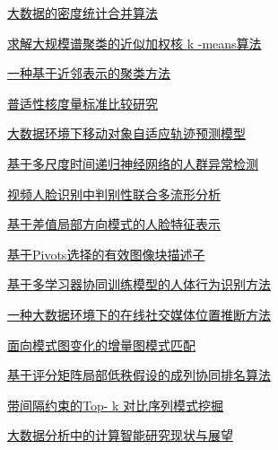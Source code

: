 \documentclass[a4paper]{article}
\begin{document}
\href{http://www.jos.org.cn/ch/reader/download_pdf.aspx?file_no=4902&year_id=2015&quarter_id=11&falg=1}{大数据的密度统计合并算法}

\href{http://www.jos.org.cn/ch/reader/download_pdf.aspx?file_no=4888&year_id=2015&quarter_id=11&falg=1}{求解大规模谱聚类的近似加权核 k -means算法}

\href{http://www.jos.org.cn/ch/reader/download_pdf.aspx?file_no=4895&year_id=2015&quarter_id=11&falg=1}{一种基于近邻表示的聚类方法}

\href{http://www.jos.org.cn/ch/reader/download_pdf.aspx?file_no=4905&year_id=2015&quarter_id=11&falg=1}{普适性核度量标准比较研究}

\href{http://www.jos.org.cn/ch/reader/download_pdf.aspx?file_no=4889&year_id=2015&quarter_id=11&falg=1}{大数据环境下移动对象自适应轨迹预测模型}

\href{http://www.jos.org.cn/ch/reader/download_pdf.aspx?file_no=4893&year_id=2015&quarter_id=11&falg=1}{基于多尺度时间递归神经网络的人群异常检测}

\href{http://www.jos.org.cn/ch/reader/download_pdf.aspx?file_no=4894&year_id=2015&quarter_id=11&falg=1}{视频人脸识别中判别性联合多流形分析}

\href{http://www.jos.org.cn/ch/reader/download_pdf.aspx?file_no=4896&year_id=2015&quarter_id=11&falg=1}{基于差值局部方向模式的人脸特征表示}

\href{http://www.jos.org.cn/ch/reader/download_pdf.aspx?file_no=4898&year_id=2015&quarter_id=11&falg=1}{基于Pivots选择的有效图像块描述子}

\href{http://www.jos.org.cn/ch/reader/download_pdf.aspx?file_no=4899&year_id=2015&quarter_id=11&falg=1}{基于多学习器协同训练模型的人体行为识别方法}

\href{http://www.jos.org.cn/ch/reader/download_pdf.aspx?file_no=4907&year_id=2015&quarter_id=11&falg=1}{一种大数据环境下的在线社交媒体位置推断方法}

\href{http://www.jos.org.cn/ch/reader/download_pdf.aspx?file_no=4891&year_id=2015&quarter_id=11&falg=1}{面向模式图变化的增量图模式匹配}

\href{http://www.jos.org.cn/ch/reader/download_pdf.aspx?file_no=4904&year_id=2015&quarter_id=11&falg=1}{基于评分矩阵局部低秩假设的成列协同排名算法}

\href{http://www.jos.org.cn/ch/reader/download_pdf.aspx?file_no=4906&year_id=2015&quarter_id=11&falg=1}{带间隔约束的Top- k 对比序列模式挖掘}

\href{http://www.jos.org.cn/ch/reader/download_pdf.aspx?file_no=4900&year_id=2015&quarter_id=11&falg=1}{大数据分析中的计算智能研究现状与展望}
\end{document}
